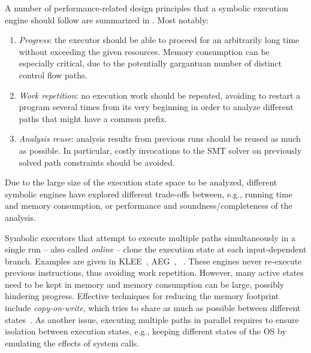 A number %
of performance-related design principles that a symbolic execution engine should follow are  summarized in %
\cite{MAYHEM-SP12}. Most notably:
\begin{enumerate}
	\item {\em Progress}: the executor should be able to proceed for an arbitrarily long time without exceeding the given resources. Memory consumption can be especially critical, due to the potentially gargantuan number of distinct control flow paths.
	\item {\em Work repetition}: no execution work should be repeated, avoiding to restart a program several times from its very beginning in order to analyze different paths that might have a  common prefix.
	\item {\em Analysis reuse}: analysis results from previous runs should be reused as much as possible. In particular, costly invocations to the SMT solver on  previously solved path constraints should be avoided.
\end{enumerate}

\noindent Due to the large size of the execution state space to be analyzed, different symbolic engines have explored different trade-offs between, e.g., running time and memory consumption, or performance and soundness/completeness of the analysis.

Symbolic executors that attempt to execute multiple paths simultaneously in a single run -- also called {\em online} -- clone the execution state at each input-dependent branch. Examples are given in {\textsc KLEE}~\cite{KLEE-OSDI08}, {\textsc AEG}~\cite{AEG-NDSS11}, {\textsc \stwoe}~\cite{CKC-TOCS12}. These engines never re-execute previous instructions, thus avoiding work repetition. However, many active states need to be kept in memory and memory consumption can be large, possibly hindering progress. Effective techniques for reducing the memory footprint include {\em copy-on-write}, which tries to share as much as possible between different states~\cite{KLEE-OSDI08}. As another issue, executing multiple paths in parallel requires to ensure isolation between execution states, e.g., keeping different states of the OS by emulating the effects of system calls.

